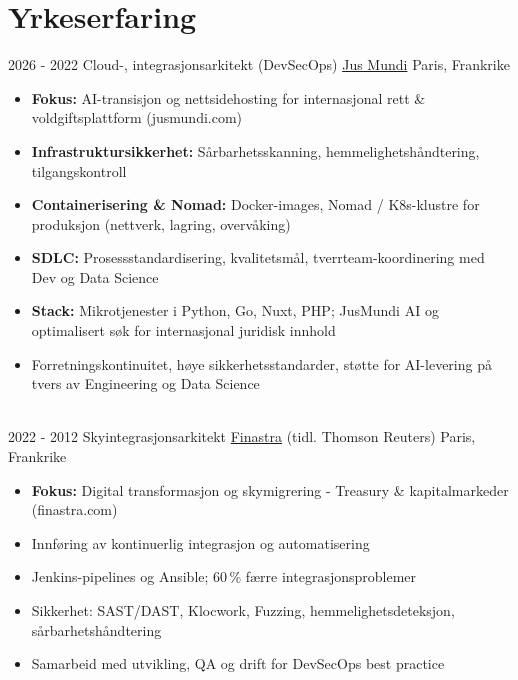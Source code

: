 \documentclass[letterpaper]{twentysecondcv} %
\begin{document}
\makeprofile %


\section{Yrkeserfaring}

\begin{twentytimeline}
	\twentyitemtimeline{\faCloud}
		{2026 -}
		{2022}
		{Cloud-, integrasjonsarkitekt (DevSecOps)}
		{\href{https://www.jusmundi.com}{Jus Mundi}}
		{Paris, Frankrike}
		{\begin{itemize}
		\item \textbf{Fokus:} AI-transisjon og nettsidehosting for internasjonal rett \& voldgiftsplattform (jusmundi.com)
		\item \textbf{Infrastruktursikkerhet:} Sårbarhetsskanning, hemmelighetshåndtering, tilgangskontroll
		\item \textbf{Containerisering \& Nomad:} Docker-images, Nomad / K8s-klustre for produksjon (nettverk, lagring, overvåking)
		\item \textbf{SDLC:} Prosessstandardisering, kvalitetsmål, tverrteam-koordinering med Dev og Data Science
		\item \textbf{Stack:} Mikrotjenester i Python, Go, Nuxt, PHP; JusMundi AI og optimalisert søk for internasjonal juridisk innhold
		\item Forretningskontinuitet, høye sikkerhetsstandarder, støtte for AI-levering på tvers av Engineering og Data Science
		\end{itemize}}
	\\
	\twentyitemtimeline{\faUsers}
		{2022 -}
		{2012}
		{Skyintegrasjonsarkitekt}
		{\href{https://finastra.com}{Finastra} (tidl. Thomson Reuters)}
		{Paris, Frankrike}
		{\begin{itemize}
		\item \textbf{Fokus:} Digital transformasjon og skymigrering - Treasury \& kapitalmarkeder (finastra.com)
		\item Innføring av kontinuerlig integrasjon og automatisering
		\item Jenkins-pipelines og Ansible; 60\,\% færre integrasjonsproblemer
		\item Sikkerhet: SAST/DAST, Klocwork, Fuzzing, hemmelighetsdeteksjon, sårbarhetshåndtering
		\item Samarbeid med utvikling, QA og drift for DevSecOps best practice

\end{itemize}}
\end{twentytimeline}
\end{document}
